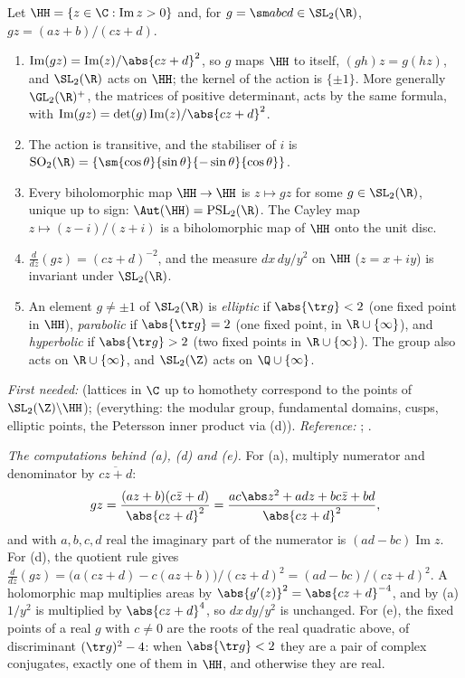 \begin{theorem}\label{thm:prereq:halfplane}
Let $\HH=\{z\in\C:\operatorname{Im}z>0\}$ and, for $g=\sm abcd\in\SL_2(\R)$, $gz=(az+b)/(cz+d)$.
\begin{enumerate}[label=(\alph*)]
\item $\operatorname{Im}(gz)=\operatorname{Im}(z)/\abs{cz+d}^2$, so $g$ maps $\HH$ to itself,
$(gh)z=g(hz)$, and $\SL_2(\R)$ acts on $\HH$; the kernel of the action is $\{\pm1\}$. More
generally $\GL_2(\R)^+$, the matrices of positive determinant, acts by the same formula, with
$\operatorname{Im}(gz)=\det(g)\operatorname{Im}(z)/\abs{cz+d}^2$.
\item The action is transitive, and the stabiliser of $i$ is
$\mathrm{SO}_2(\R)=\{\sm{\cos\theta}{\sin\theta}{-\sin\theta}{\cos\theta}\}$.
\item Every biholomorphic map $\HH\to\HH$ is $z\mapsto gz$ for some $g\in\SL_2(\R)$, unique up to
sign: $\Aut(\HH)=\mathrm{PSL}_2(\R)$. The Cayley map $z\mapsto(z-i)/(z+i)$ is a biholomorphic map of
$\HH$ onto the unit disc.
\item $\frac{d}{dz}(gz)=(cz+d)^{-2}$, and the measure $dx\,dy/y^2$ on $\HH$ ($z=x+iy$) is invariant
under $\SL_2(\R)$.
\item An element $g\ne\pm1$ of $\SL_2(\R)$ is \emph{elliptic} if $\abs{\tr g}<2$ (one fixed point in
$\HH$), \emph{parabolic} if $\abs{\tr g}=2$ (one fixed point, in $\R\cup\{\infty\}$), and
\emph{hyperbolic} if $\abs{\tr g}>2$ (two fixed points in $\R\cup\{\infty\}$). The group also acts
on $\R\cup\{\infty\}$, and $\SL_2(\Z)$ acts on $\Q\cup\{\infty\}$.
\end{enumerate}
\end{theorem}
\noindent\emph{First needed:}  (lattices in $\C$ up to homothety correspond to
the points of $\SL_2(\Z)\backslash\HH$);  (everything: the modular group,
fundamental domains, cusps, elliptic points, the Petersson inner product via (d)).
\emph{Reference:} \cite[Chapter 3, Section 3]{Ahlfors79}; \cite[Chapter 1]{DiamondShurman}.

\emph{The computations behind (a), (d) and (e).} For (a), multiply numerator and denominator by
$\overline{cz+d}$:
\[
gz=\frac{(az+b)(c\bar z+d)}{\abs{cz+d}^2}
=\frac{ac\abs z^2+adz+bc\bar z+bd}{\abs{cz+d}^2},
\]
and with $a,b,c,d$ real the imaginary part of the numerator is $(ad-bc)\operatorname{Im}z$. For (d),
the quotient rule gives $\frac d{dz}(gz)=\bigl(a(cz+d)-c(az+b)\bigr)/(cz+d)^2=(ad-bc)/(cz+d)^2$. A
holomorphic map multiplies areas by $\abs{g'(z)}^2=\abs{cz+d}^{-4}$, and by (a) $1/y^2$ is multiplied
by $\abs{cz+d}^4$, so $dx\,dy/y^2$ is unchanged. For (e), the fixed points of a real $g$ with $c\ne0$
are the roots of the real quadratic above, of discriminant $(\tr g)^2-4$: when $\abs{\tr g}<2$ they
are a pair of complex conjugates, exactly one of them in $\HH$, and otherwise they are real.

